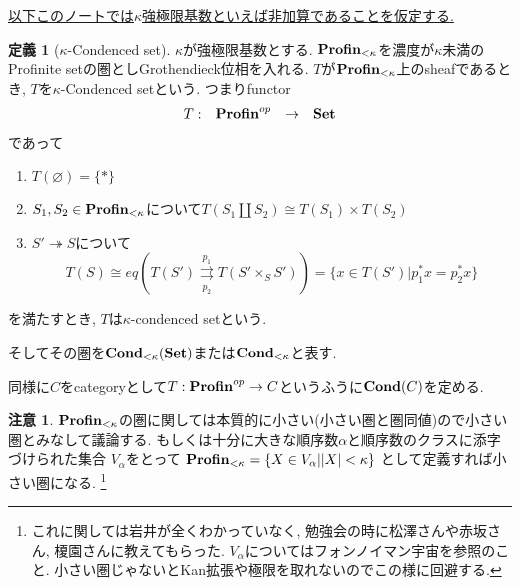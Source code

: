 \documentclass[dvipdfmx,a4paper,11pt]{report}
\theoremstyle{definition}
\newtheorem{dfn}[thm]{定義}
\newtheorem{rem}[thm]{注意}
\begin{document}
\underline{ 以下このノートでは$\kappa$強極限基数といえば非加算であることを仮定する.}
 
 \begin{tcolorbox}
 [colback = white, colframe = green!35!black, fonttitle = \bfseries,breakable = true]
\begin{dfn}[$\kappa$-Condenced set] \cite[Remark 1.3]{Sch19}
$\kappa$が強極限基数とする. 
${ \bf Profin}_{< \kappa}$を濃度が$\kappa$未満のProfinite setの圏としGrothendieck位相を入れる.
$T$が${ \bf Profin}_{< \kappa}$上のsheafであるとき, $T$を$\kappa$-Condenced setという. 
つまりfunctor
 $$
\begin{array}{cccc}
T : &{\bf Profin}^{op}& \rightarrow &{\bf Set}  \\
\end{array}
$$
であって
\begin{enumerate}
\item $T(\varnothing) = \{ \ast\}$
\item $S_1, S_2 \in {\bf Profin}_{< \kappa}$について$T(S_1 \coprod S_2) \cong T(S_1) \times T(S_2)$
\item $S' \twoheadrightarrow S$について
$$
T(S) \cong eq(T(S')\underset{p_2}{\overset{p_1}{\rightrightarrows}} T(S' \times_{S} S'))
=\{ x \in T(S') | p_{1}^{*}x = p_{2}^{*}x\}
$$
\end{enumerate}
を満たすとき, $T$は$\kappa$-condenced setという. 

そしてその圏を${\bf Cond}_{<\kappa}({\bf Set})$または${\bf Cond}_{<\kappa}$と表す. 
 \end{dfn}
 \end{tcolorbox}
 同様に$C$をcategoryとして$T : {\bf Profin}^{op} \rightarrow  C$というふうに${\bf Cond}(C)$を定める. 
 
 \begin{rem}
$ { \bf Profin}_{< \kappa}$の圏に関しては本質的に小さい(小さい圏と圏同値)ので小さい圏とみなして議論する. 
もしくは十分に大きな順序数$\alpha$と順序数のクラスに添字づけられた集合
$V_{\alpha}$をとって
$ {\bf Profin}_{< \kappa} = \{ X\in V_{\alpha} | |X|<\kappa\}$
として定義すれば小さい圏になる. \footnote{これに関しては岩井が全くわかっていなく, 勉強会の時に松澤さんや赤坂さん, 榎園さんに教えてもらった. $V_{\alpha}$についてはフォンノイマン宇宙を参照のこと. 小さい圏じゃないとKan拡張や極限を取れないのでこの様に回避する.}
 \end{rem}
\end{document}

